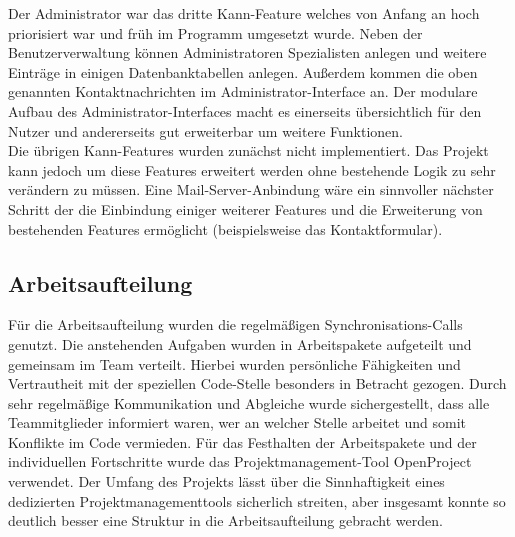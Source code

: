 Der Administrator war das dritte Kann-Feature welches von Anfang an hoch priorisiert war und früh im Programm umgesetzt wurde. Neben der Benutzerverwaltung können Administratoren Spezialisten anlegen und weitere Einträge in einigen Datenbanktabellen anlegen. Außerdem kommen die oben genannten Kontaktnachrichten im Administrator-Interface an. Der modulare Aufbau des Administrator-Interfaces macht es einerseits übersichtlich für den Nutzer und andererseits gut erweiterbar um weitere Funktionen.\\
Die übrigen Kann-Features wurden zunächst nicht implementiert. Das Projekt kann jedoch um diese Features erweitert werden ohne bestehende Logik zu sehr verändern zu müssen. Eine Mail-Server-Anbindung wäre ein sinnvoller nächster Schritt der die Einbindung einiger weiterer Features und die Erweiterung von bestehenden Features ermöglicht (beispielsweise das Kontaktformular).

\subsection{Arbeitsaufteilung}
\label{Arbeitsaufteilung}

Für die Arbeitsaufteilung wurden die regelmäßigen Synchronisations-Calls genutzt. Die anstehenden Aufgaben wurden in Arbeitspakete aufgeteilt und gemeinsam im Team verteilt. Hierbei wurden persönliche Fähigkeiten und Vertrautheit mit der speziellen Code-Stelle besonders in Betracht gezogen. Durch sehr regelmäßige Kommunikation und Abgleiche wurde sichergestellt, dass alle Teammitglieder informiert waren, wer an welcher Stelle arbeitet und somit Konflikte im Code vermieden.
Für das Festhalten der Arbeitspakete und der individuellen Fortschritte wurde das Projektmanagement-Tool OpenProject verwendet. Der Umfang des Projekts lässt über die Sinnhaftigkeit eines dedizierten Projektmanagementtools sicherlich streiten, aber insgesamt konnte so deutlich besser eine Struktur in die Arbeitsaufteilung gebracht werden. \\